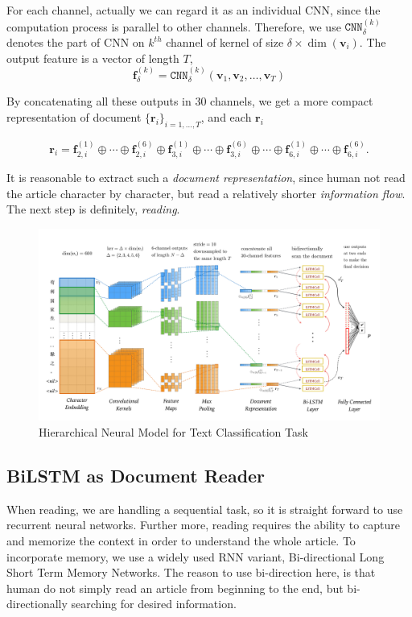 \documentclass{article}
\begin{document}
For each channel, actually we can regard it as an individual CNN, since the computation process is parallel to other channels. Therefore, we use $\mathtt{CNN}^{(k)}_{\delta}$ denotes the part of CNN on $k^{th}$ channel of kernel of size $\delta \times \dim(\bm v_i)$. The output feature is a vector of length $T$,
	\[\bm f_{\delta}^{(k)} = \mathtt{CNN}^{(k)}_{\delta}(\bm v_1, \bm v_2, \dots, \bm v_T)\]

By concatenating all these outputs in 30 channels, we get a more compact representation of document $\{\bm r_i\}_{i=1,\dots,T}$, and each $\bm r_i$

\[\bm r_i = \bm f_{2, i}^{(1)} \oplus \cdots \oplus \bm f_{2, i}^{(6)} \oplus \bm f_{3, i}^{(1)} \oplus \cdots \oplus \bm f_{3, i}^{(6)} 
	\oplus \cdots \oplus \bm f_{6, i}^{(1)} \oplus \cdots \oplus \bm f_{6, i}^{(6)}.\]

It is reasonable to extract such a {\em document representation}, since human not read the article character by character, but read a relatively shorter {\em information flow}. The next step is definitely, {\em reading}.

\begin{figure}[tbp!]
	\centering
	\includegraphics[width = \textwidth]{figures/model.pdf}
	\caption{Hierarchical Neural Model for Text Classification Task}
	\label{fig:model}
\end{figure}

\subsection{BiLSTM as Document Reader}
When reading, we are handling a sequential task, so it is straight forward to use recurrent neural networks. Further more, reading requires the ability to capture and memorize the context in order to understand the whole article. To incorporate memory, we use a widely used RNN variant, Bi-directional Long Short Term Memory Networks. The reason to use bi-direction here, is that human do not simply read an article from beginning to the end, but bi-directionally searching for desired information.
\end{document}

